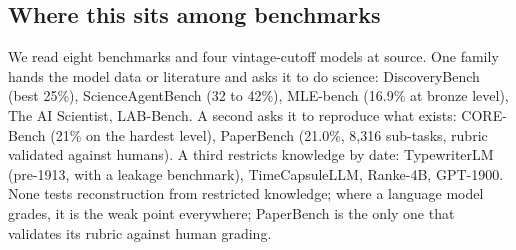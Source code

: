 
\subsection{Where this sits among benchmarks}

We read eight benchmarks and four vintage-cutoff models at source. One family hands the model data or literature and asks it to do science: DiscoveryBench (best 25\%), ScienceAgentBench (32 to 42\%), MLE-bench (16.9\% at bronze level), The AI Scientist, LAB-Bench. A second asks it to reproduce what exists: CORE-Bench (21\% on the hardest level), PaperBench (21.0\%, 8,316 sub-tasks, rubric validated against humans). A third restricts knowledge by date: TypewriterLM (pre-1913, with a leakage benchmark), TimeCapsuleLLM, Ranke-4B, GPT-1900. None tests reconstruction from restricted knowledge; where a language model grades, it is the weak point everywhere; PaperBench is the only one that validates its rubric against human grading.
